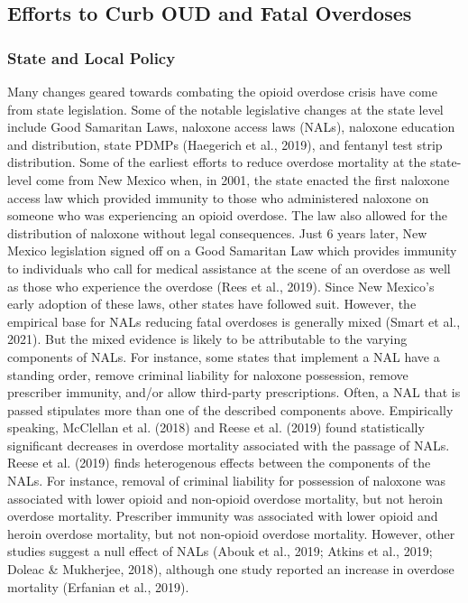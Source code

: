 \subsection{Efforts to Curb OUD and Fatal Overdoses}
\subsubsection{State and Local Policy}

Many changes geared towards combating the opioid overdose crisis have come from state legislation. Some of the notable legislative changes at the state level include Good Samaritan Laws, naloxone access laws (NALs), naloxone education and distribution, state PDMPs (Haegerich et al., 2019), and fentanyl test strip distribution. Some of the earliest efforts to reduce overdose mortality at the state-level come from New Mexico when, in 2001, the state enacted the first naloxone access law which provided immunity to those who administered naloxone on someone who was experiencing an opioid overdose. The law also allowed for the distribution of naloxone without legal consequences. Just 6 years later, New Mexico legislation signed off on a Good Samaritan Law which provides immunity to individuals who call for medical assistance at the scene of an overdose as well as those who experience the overdose (Rees et al., 2019). Since New Mexico’s early adoption of these laws, other states have followed suit. However, the empirical base for NALs reducing fatal overdoses is generally mixed (Smart et al., 2021). But the mixed evidence is likely to be attributable to the varying components of NALs. For instance, some states that implement a NAL have a standing order, remove criminal liability for naloxone possession, remove prescriber immunity, and/or allow third-party prescriptions. Often, a NAL that is passed stipulates more than one of the described components above. Empirically speaking, McClellan et al. (2018) and Reese et al. (2019) found statistically significant decreases in overdose mortality associated with the passage of NALs. Reese et al. (2019) finds heterogenous effects between the components of the NALs. For instance, removal of criminal liability for possession of naloxone was associated with lower opioid and non-opioid overdose mortality, but not heroin overdose mortality. Prescriber immunity was associated with lower opioid and heroin overdose mortality, but not non-opioid overdose mortality. However, other studies suggest a null effect of NALs (Abouk et al., 2019; Atkins et al., 2019; Doleac \& Mukherjee, 2018), although one study reported an increase in overdose mortality (Erfanian et al., 2019). 

